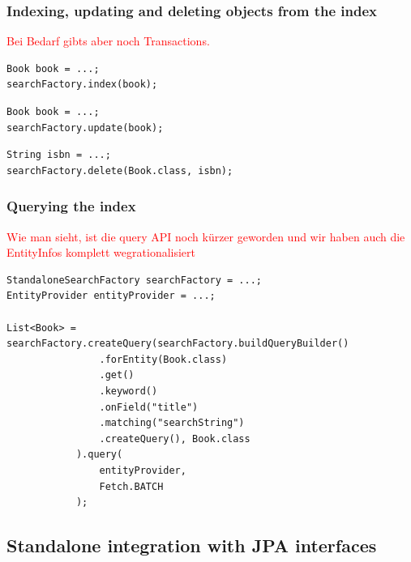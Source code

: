 \subsubsection{Indexing, updating and deleting objects from the index}

\textcolor{red}{Bei Bedarf gibts aber noch Transactions.}

\lstset{language=java}
\begin{lstlisting}[frame=htrbl, caption={Indexing an object with the standalone}, label={lst:indexing_object_native.java}]
Book book = ...;
searchFactory.index(book);
\end{lstlisting}

\lstset{language=java}
\begin{lstlisting}[frame=htrbl, caption={Updating an object with the standalone}, label={lst:updating_object_native.java}]
Book book = ...;
searchFactory.update(book);
\end{lstlisting}

\lstset{language=java}
\begin{lstlisting}[frame=htrbl, caption={Deleting an object by id with the standalone}, label={lst:deleting_object_native.java}]
String isbn = ...;
searchFactory.delete(Book.class, isbn);
\end{lstlisting}

\subsubsection{Querying the index}

\textcolor{red}{Wie man sieht, ist die query API noch kürzer geworden und wir haben auch die EntityInfos komplett wegrationalisiert}

\lstset{language=java}
\begin{lstlisting}[frame=htrbl, caption={Querying the index with the standalone}, label={lst:querying_natively.java}]
StandaloneSearchFactory searchFactory = ...;
EntityProvider entityProvider = ...;

List<Book> = searchFactory.createQuery(searchFactory.buildQueryBuilder()
				.forEntity(Book.class)
				.get()
				.keyword()
				.onField("title")
				.matching("searchString")
				.createQuery(), Book.class
			).query(
				entityProvider,
				Fetch.BATCH
			);
\end{lstlisting}

\pagebreak

\subsection{Standalone integration with JPA interfaces}

